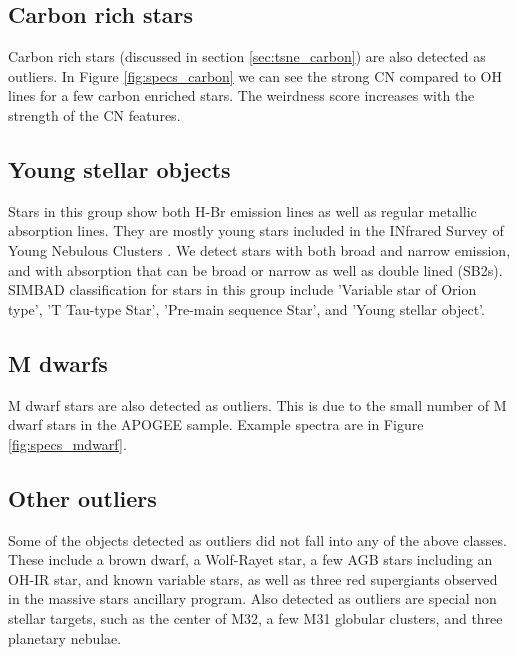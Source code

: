 \documentclass[fleqn,usenatbib]{mnras}
\begin{document}
\subsection{Carbon rich stars}
\label{carbon}

Carbon rich stars (discussed in section \ref{sec:tsne_carbon}) are also detected as outliers. In Figure \ref{fig:specs_carbon} we can see the strong $\mathrm{CN}$ compared to $\mathrm{OH}$ lines for a few carbon enriched stars. The weirdness score increases with the strength of the $\mathrm{CN}$ features. 

\subsection{Young stellar objects}
Stars in this group show both H-Br emission lines as well as regular metallic absorption lines. They are mostly young stars included in the INfrared Survey of Young Nebulous Clusters \citep[IN-SYNC, ][]{cottaar14}.
We detect stars with both broad and narrow emission, and with absorption that can be broad or narrow as well as double lined (SB2s).  SIMBAD classification for stars in this group include  'Variable star of Orion type',  'T Tau-type Star', 'Pre-main sequence Star', and  'Young stellar object'.  


\subsection{M dwarfs}
M dwarf stars are also detected as outliers. This is due to the small number of M dwarf stars in the APOGEE sample. Example spectra are in Figure \ref{fig:specs_mdwarf}.

\subsection{Other outliers}
Some of the objects detected as outliers did not fall into any of the above classes. These include a brown dwarf, a Wolf-Rayet star, a few AGB stars including an OH-IR star, and known variable stars, as well as three red supergiants observed in the massive stars ancillary program. Also detected as outliers are special non stellar targets, such as the center of M32, a few M31 globular clusters, and three planetary nebulae.
\end{document}
